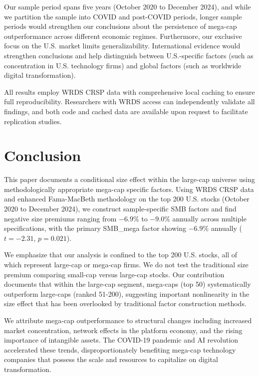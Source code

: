 \documentclass[10pt,letterpaper]{article}
\begin{document}
Our sample period spans five years (October 2020 to December 2024), and while we partition the sample into COVID and post-COVID periods, longer sample periods would strengthen our conclusions about the persistence of mega-cap outperformance across different economic regimes. Furthermore, our exclusive focus on the U.S. market limits generalizability. International evidence would strengthen conclusions and help distinguish between U.S.-specific factors (such as concentration in U.S. technology firms) and global factors (such as worldwide digital transformation).

All results employ WRDS CRSP data with comprehensive local caching to ensure full reproducibility. Researchers with WRDS access can independently validate all findings, and both code and cached data are available upon request to facilitate replication studies.

\section*{Conclusion}

This paper documents a conditional size effect within the large-cap universe using methodologically appropriate mega-cap specific factors. Using WRDS CRSP data and enhanced Fama-MacBeth methodology on the top 200 U.S. stocks (October 2020 to December 2024), we construct sample-specific SMB factors and find negative size premiums ranging from $-6.9\%$ to $-9.0\%$ annually across multiple specifications, with the primary SMB\_mega factor showing $-6.9\%$ annually ($t=-2.31$, $p=0.021$).

We emphasize that our analysis is confined to the top 200 U.S. stocks, all of which represent large-cap or mega-cap firms. We do not test the traditional size premium comparing small-cap versus large-cap stocks. Our contribution documents that within the large-cap segment, mega-caps (top 50) systematically outperform large-caps (ranked 51-200), suggesting important nonlinearity in the size effect that has been overlooked by traditional factor construction methods.

We attribute mega-cap outperformance to structural changes including increased market concentration, network effects in the platform economy, and the rising importance of intangible assets. The COVID-19 pandemic and AI revolution accelerated these trends, disproportionately benefiting mega-cap technology companies that possess the scale and resources to capitalize on digital transformation.
\end{document}
